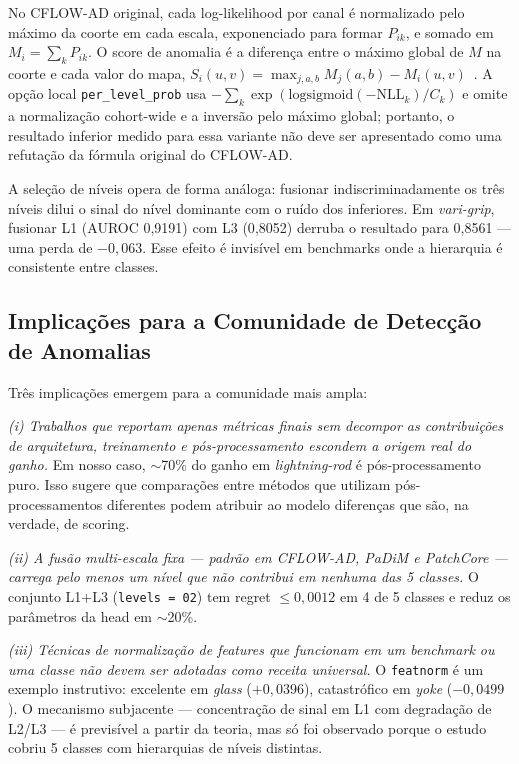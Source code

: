 \documentclass[conference]{IEEEtran}
\begin{document}
No CFLOW-AD original, cada log-likelihood por canal é normalizado pelo máximo da coorte em cada escala, exponenciado para formar $P_{ik}$, e somado em $M_i=\sum_kP_{ik}$. O score de anomalia é a diferença entre o máximo global de $M$ na coorte e cada valor do mapa, $S_i(u,v)=\max_{j,a,b}M_j(a,b)-M_i(u,v)$~\cite{gudovskiy2022cflow}. A opção local \texttt{per\_level\_prob} usa $-\sum_k\exp(\text{logsigmoid}(-\text{NLL}_k)/C_k)$ e omite a normalização cohort-wide e a inversão pelo máximo global; portanto, o resultado inferior medido para essa variante não deve ser apresentado como uma refutação da fórmula original do CFLOW-AD.

A seleção de níveis opera de forma análoga: fusionar indiscriminadamente os três níveis dilui o sinal do nível dominante com o ruído dos inferiores. Em \textit{vari-grip}, fusionar L1 (AUROC 0{,}9191) com L3 (0{,}8052) derruba o resultado para 0{,}8561 --- uma perda de $-0{,}063$. Esse efeito é invisível em benchmarks onde a hierarquia é consistente entre classes.

\subsection{Implicações para a Comunidade de Detecção de Anomalias}

Três implicações emergem para a comunidade mais ampla:

\textit{(i) Trabalhos que reportam apenas métricas finais sem decompor as contribuições de arquitetura, treinamento e pós-processamento escondem a origem real do ganho.} Em nosso caso, $\sim$70\% do ganho em \textit{lightning-rod} é pós-processamento puro. Isso sugere que comparações entre métodos que utilizam pós-processamentos diferentes podem atribuir ao modelo diferenças que são, na verdade, de scoring.

\textit{(ii) A fusão multi-escala fixa --- padrão em CFLOW-AD, PaDiM e PatchCore --- carrega pelo menos um nível que não contribui em nenhuma das 5 classes.} O conjunto L1+L3 (\texttt{levels\,=\,02}) tem regret $\leq 0{,}0012$ em 4 de 5 classes e reduz os parâmetros da head em $\sim$20\%.

\textit{(iii) Técnicas de normalização de features que funcionam em um benchmark ou uma classe não devem ser adotadas como receita universal.} O \texttt{featnorm} é um exemplo instrutivo: excelente em \textit{glass} ($+0{,}0396$), catastrófico em \textit{yoke} ($-0{,}0499$). O mecanismo subjacente --- concentração de sinal em L1 com degradação de L2/L3 --- é previsível a partir da teoria, mas só foi observado porque o estudo cobriu 5 classes com hierarquias de níveis distintas.
\end{document}
